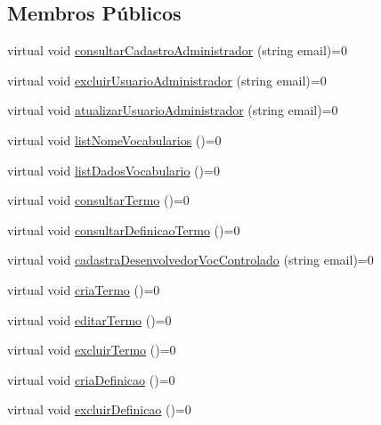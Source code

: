 \subsection*{Membros Públicos}
\begin{DoxyCompactItemize}
\item 
virtual void \mbox{\hyperlink{class_crlt_servico_usuario_administrador_af98ebf0c1347a8df6a06e8465312ed3a}{consultar\+Cadastro\+Administrador}} (string email)=0
\item 
virtual void \mbox{\hyperlink{class_crlt_servico_usuario_administrador_ae45ee7ca343542d01898c2919e2671a1}{excluir\+Usuario\+Administrador}} (string email)=0
\item 
virtual void \mbox{\hyperlink{class_crlt_servico_usuario_administrador_ab0492870331c189997ea174f0482202e}{atualizar\+Usuario\+Administrador}} (string email)=0
\item 
virtual void \mbox{\hyperlink{class_crlt_servico_usuario_administrador_ad9ced45046d895a48f1b84b975b89cb1}{list\+Nome\+Vocabularios}} ()=0
\item 
virtual void \mbox{\hyperlink{class_crlt_servico_usuario_administrador_af6b9c9eb9a047c0677de25b07062bff5}{list\+Dados\+Vocabulario}} ()=0
\item 
virtual void \mbox{\hyperlink{class_crlt_servico_usuario_administrador_a6924f2f9e7b9b80ddc1be753628fe989}{consultar\+Termo}} ()=0
\item 
virtual void \mbox{\hyperlink{class_crlt_servico_usuario_administrador_a2cddc1d55c76597e69ce39dab1dc1026}{consultar\+Definicao\+Termo}} ()=0
\item 
virtual void \mbox{\hyperlink{class_crlt_servico_usuario_administrador_ac0432bf5b0788a20f018781bcca74e45}{cadastra\+Desenvolvedor\+Voc\+Controlado}} (string email)=0
\item 
virtual void \mbox{\hyperlink{class_crlt_servico_usuario_administrador_af7c63b86c3ee31bf1a0ae5edca56515c}{cria\+Termo}} ()=0
\item 
virtual void \mbox{\hyperlink{class_crlt_servico_usuario_administrador_a18da82fdae717b90254dbaa003ac14cb}{editar\+Termo}} ()=0
\item 
virtual void \mbox{\hyperlink{class_crlt_servico_usuario_administrador_aa56d5aaff3fcf0dce12f969db7089204}{excluir\+Termo}} ()=0
\item 
virtual void \mbox{\hyperlink{class_crlt_servico_usuario_administrador_a7212381b97babb06c887847980a19d81}{cria\+Definicao}} ()=0
\item 
virtual void \mbox{\hyperlink{class_crlt_servico_usuario_administrador_a37d525a705885131f08e8f74c0926578}{excluir\+Definicao}} ()=0

\end{DoxyCompactItemize}
